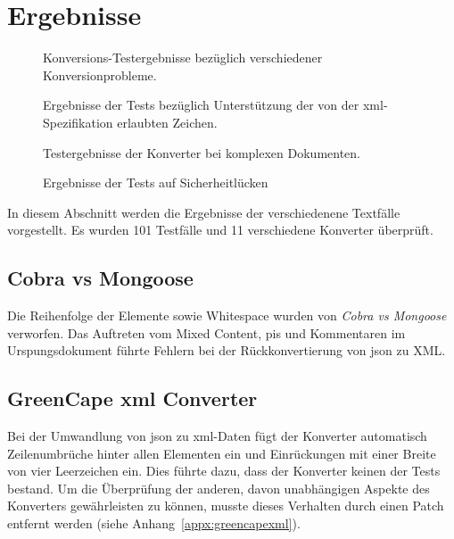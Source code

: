 \chapter{Ergebnisse} \label{chap:results}

\begin{figure}[b!]
    \label{fig:results-basic}
    
    \caption{Konversions-Testergebnisse bezüglich verschiedener Konversionprobleme.}
\end{figure}

\begin{figure}[t!]
    \label{fig:results-chars}
    
    \caption{Ergebnisse der Tests bezüglich Unterstützung der von der \acrshort{xml}-Spezifikation erlaubten Zeichen.}

     \vspace*{\floatsep}

    \label{fig:results-complex}
    
    \caption{Testergebnisse der Konverter bei komplexen Dokumenten.}
\end{figure}

\begin{figure}[t!]
    \label{fig:results-sec}
    
    \caption{Ergebnisse der Tests auf Sicherheitlücken}
\end{figure}

In diesem Abschnitt werden die Ergebnisse der verschiedenene Textfälle vorgestellt. Es wurden 101 Testfälle und 11 verschiedene Konverter überprüft.

\section{Cobra vs Mongoose}
\label{sec:cobravsmongoose}

Die Reihenfolge der Elemente sowie Whitespace wurden von \emph{Cobra vs Mongoose} verworfen. Das Auftreten vom Mixed Content, \glspl{pi} und Kommentaren im Urspungsdokument führte Fehlern bei der Rückkonvertierung von \acrshort{json} zu XML.

\section{GreenCape \acrshort{xml} Converter}
\label{sec:greencapexml}

Bei der Umwandlung von \acrshort{json} zu \acrshort{xml}-Daten fügt der Konverter automatisch Zeilenumbrüche hinter allen Elementen ein und Einrückungen mit einer Breite von vier Leerzeichen ein. Dies führte dazu, dass der Konverter keinen der Tests bestand. Um die Überprüfung der anderen, davon unabhängigen Aspekte des Konverters gewährleisten zu können, musste dieses Verhalten durch einen Patch entfernt werden (siehe Anhang~\ref{appx:greencapexml}).

